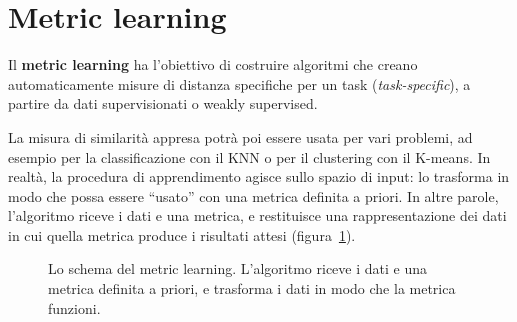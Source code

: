 \section{Metric learning}
\begin{definizione}
Il \textbf{metric learning} ha l'obiettivo di costruire algoritmi che creano automaticamente misure di distanza specifiche per un task (\emph{task-specific}), a partire da dati supervisionati o weakly supervised.
\end{definizione}
La misura di similarità appresa potrà poi essere usata per vari problemi, ad esempio per la classificazione con il KNN o per il clustering con il K-means. In realtà, la procedura di apprendimento agisce sullo spazio di input: lo trasforma in modo che possa essere ``usato'' con una metrica definita a priori. In altre parole, l'algoritmo riceve i dati e una metrica, e restituisce una rappresentazione dei dati in cui quella metrica produce i risultati attesi (figura~\ref{fig:ml-schema}).

\begin{figure}[htbp]
\centering
{}
\caption{Lo schema del metric learning. L'algoritmo riceve i dati e una metrica definita a priori, e trasforma i dati in modo che la metrica funzioni.}
\label{fig:ml-schema}
\end{figure}

